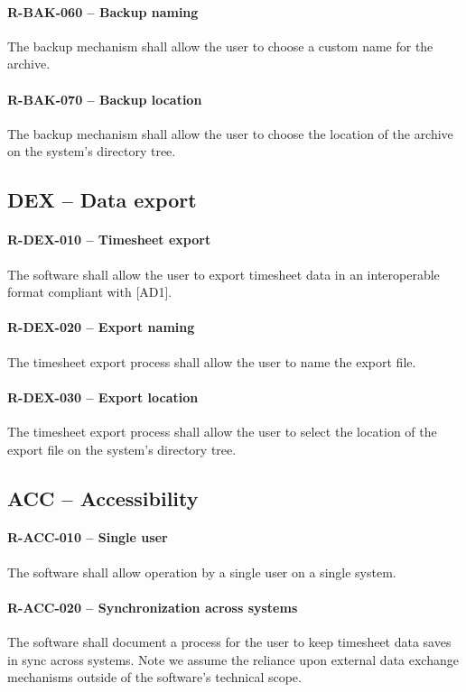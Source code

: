 \paragraph{R-BAK-060 -- Backup naming}
The backup mechanism shall allow the user to choose a custom name for the
archive.

\paragraph{R-BAK-070 -- Backup location}
The backup mechanism shall allow the user to choose the location of the
archive on the system's directory tree.

\subsection{DEX -- Data export}
\paragraph{R-DEX-010 -- Timesheet export}
The software shall allow the user to export timesheet data in an interoperable
format compliant with [AD1].

\paragraph{R-DEX-020 -- Export naming}
The timesheet export process shall allow the user to name the export file.

\paragraph{R-DEX-030 -- Export location}
The timesheet export process shall allow the user to select the location
of the export file on the system's directory tree.

\subsection{ACC -- Accessibility}
\paragraph{R-ACC-010 -- Single user}
The software shall allow operation by a single user on a single system.

\paragraph{R-ACC-020 -- Synchronization across systems}
The software shall document a process for the user to keep timesheet data
saves in sync across systems. Note we assume the reliance upon external
data exchange mechanisms outside of the software's technical scope.


